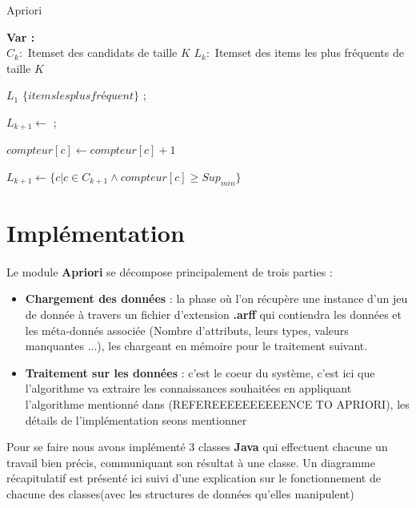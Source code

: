 	
		\begin{algorithm}[H]
			\caption{Apriori}
			
			\textbf{Var :} \\
			$C_k : $ Itemset des candidats de taille $K$
			$L_k : $ Itemset des items les plus fréquents de taille $K$
			
			
			\Begin
			{
				$L_1$ \gets $\lbrace items les plus fréquent \rbrace$ ;\\
				{
					$L_{k+1} \gets $ ;\\
					{
						{
							{
								$compteur[c] \gets compteur[c]+1$
							}
						}
						
					}
					$L_{k+1} \gets \lbrace 	c | c \in C_{k+1} \land compteur[c] \geq Sup_{min}\rbrace$ 	
				}
				
			}
		\end{algorithm}
	\section{Implémentation}
		
			\paragraph{}
			Le module \textbf{Apriori} se décompose principalement de trois parties : 
			\begin{itemize}
				\item \textbf{Chargement des données} : la phase où l'on récupère une instance d'un jeu de donnée à travers un fichier d'extension \textbf{.arff} qui contiendra les données et les méta-donnés associée (Nombre d'attributs, leurs types, valeurs manquantes ...), les chargeant en mémoire pour le traitement suivant.
				\item  \textbf{Traitement sur les données} : c'est le coeur du système, c'est ici que l'algorithme va extraire les connaissances souhaitées en appliquant l'algorithme mentionné dans (REFEREEEEEEEEEENCE TO APRIORI), les détails de l'implémentation seons mentionner 
			\end{itemize}
			\par 
			Pour se faire nous avons implémenté 3 classes \textbf{Java} qui effectuent chacune un travail bien précis, communiquant son résultat à une classe. Un diagramme récapitulatif est présenté ici suivi d'une explication sur le fonctionnement de chacune des classes(avec les structures de données qu'elles manipulent)
				
